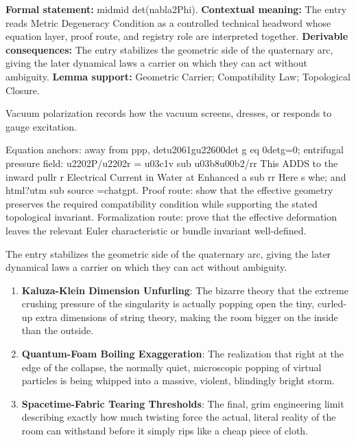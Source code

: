 \begingroup\footnotesize\setlength{\emergencystretch}{3em}\sloppy
\textbf{Formal statement:} midmid det(nabla2Phi). \textbf{Contextual meaning:} The entry reads Metric Degeneracy Condition as a controlled technical headword whose equation layer, proof route, and registry role are interpreted together. \textbf{Derivable consequences:} The entry stabilizes the geometric side of the quaternary arc, giving the later dynamical laws a carrier on which they can act without ambiguity. \textbf{Lemma support:} Geometric Carrier; Compatibility Law; Topological Closure.\par
\endgroup

Vacuum polarization records how the vacuum screens, dresses, or responds to gauge excitation.

Equation anchors: away from ppp, detu2061gu22600det g eq 0detg=0; entrifugal pressure field: u2202P/u2202r = u03c1v sub u03b8u00b2/rr This ADDS to the inward pullr r Electrical Current in Water at Enhanced a sub rr Here s whe; and html?utm sub source =chatgpt. Proof route: show that the effective geometry preserves the required compatibility condition while supporting the stated topological invariant. Formalization route: prove that the effective deformation leaves the relevant Euler characteristic or bundle invariant well-defined.

The entry stabilizes the geometric side of the quaternary arc, giving the later dynamical laws a carrier on which they can act without ambiguity.
\endgroup

\begin{enumerate}[leftmargin=1.6em,itemsep=6pt,topsep=4pt]
\item \textbf{Kaluza-Klein Dimension Unfurling}: The bizarre theory that the extreme crushing pressure of the singularity is actually popping open the tiny, curled-up extra dimensions of string theory, making the room bigger on the inside than the outside.
\item \textbf{Quantum-Foam Boiling Exaggeration}: The realization that right at the edge of the collapse, the normally quiet, microscopic popping of virtual particles is being whipped into a massive, violent, blindingly bright storm.
\item \textbf{Spacetime-Fabric Tearing Thresholds}: The final, grim engineering limit describing exactly how much twisting force the actual, literal reality of the room can withstand before it simply rips like a cheap piece of cloth.
\end{enumerate}

